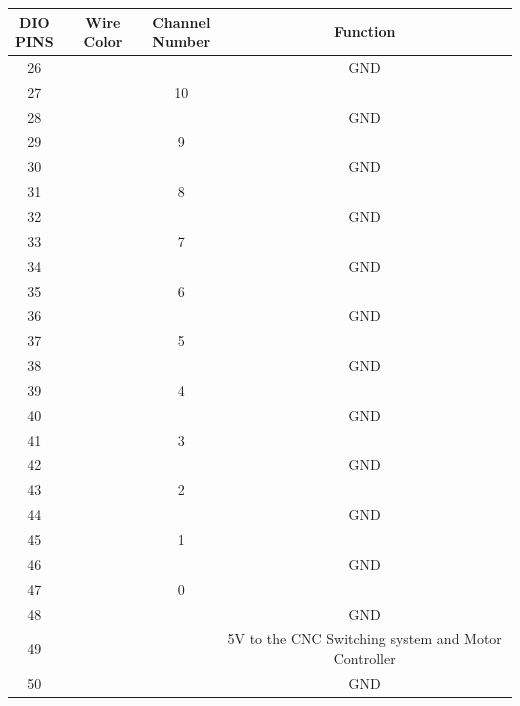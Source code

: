 \documentclass[12pt]{article}
\begin{document}
\clearpage


\begin{adjustwidth}{-2cm}{-2cm}

\begin{center}


\begin{tabular}{ |c|c|c|c| }


  \hline
  \thead{DIO \\ PINS} & \textbf{Wire Color} & \thead{Channel \\ Number} & \textbf{Function} \\ \hline
      

26 & &			& GND \\ \hline
27 & &		10 & \\ \hline	
28 & &			& GND \\ \hline
29 & &		9 & \\ \hline	
30 & &			& GND \\ \hline
31 & &		8 & \\ \hline	
32 & &			& GND \\ \hline
33 & &		7 & \\ \hline	
34 & &			& GND \\ \hline
35 & &		6 & \\ \hline	
36 & &			& GND \\ \hline
37 & &		5 & \\ \hline	
38 & &			& GND \\ \hline
39 & &		4 & \\ \hline	
40 & &			& GND \\ \hline
41 & &		3 & \\ \hline	
42 & &			& GND \\ \hline
43 & &		2 & \\ \hline	

44 & &			& GND \\ \hline
45 & &		1 & \\ \hline	
46 & &			& GND \\ \hline
47 & &		0 & \\ \hline	
48 & &			& GND \\ \hline
49 & &		 &  5V to the CNC Switching system and Motor Controller \\ \hline	
50 & &			& GND \\ \hline




  
\end{tabular}



\end{center}

\end{adjustwidth}
\end{document}
